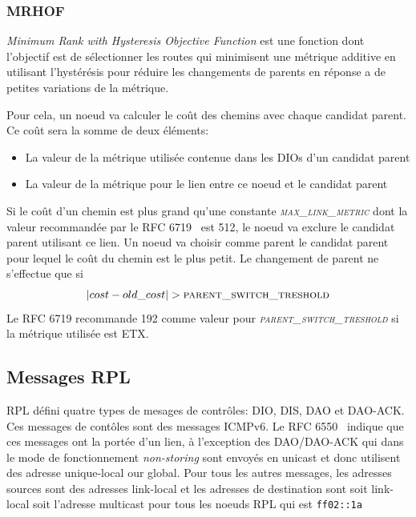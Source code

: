     \subsubsection*{MRHOF}%
            \textit{Minimum Rank with Hysteresis Objective Function} est une fonction dont l'objectif est de sélectionner les routes qui minimisent une métrique additive en utilisant l'hystérésis
            pour réduire les changements de parents en réponse a de petites variations de la métrique.
            
            Pour cela, un noeud va calculer le coût des chemins avec chaque candidat parent. Ce coût sera la somme de deux éléments:
            \begin{itemize}
                \item La valeur de la métrique utilisée contenue dans les DIOs d'un candidat parent
                \item La valeur de la métrique pour le lien entre ce noeud et le candidat parent
            \end{itemize}
            Si le coût d'un chemin est plus grand qu'une constante \textsl{\textsc{max\_link\_metric}} dont la valeur recommandée par le RFC 6719~\cite{rfc:mrhof} est 512,
            le noeud va exclure le candidat parent utilisant ce lien.
            Un noeud va choisir comme parent le candidat parent pour lequel le coût du chemin est le plus petit. Le changement de parent ne s'effectue que si 
            \[ |cost-old\_cost| > \textsc{parent\_switch\_treshold} \]
            Le RFC 6719 recommande 192 comme valeur pour \textsl{\textsc{parent\_switch\_treshold}} si la métrique utilisée est ETX.

\subsection*{Messages RPL}
    RPL défini quatre types de mesages de contrôles: DIO, DIS, DAO et DAO-ACK. Ces messages de contôles sont des messages ICMPv6. Le RFC 6550~\cite{rfc:rpl} indique que ces messages ont la portée d'un lien, à l'exception des DAO/DAO-ACK qui dans le mode de fonctionnement \textit{non-storing} sont envoyés en unicast et donc utilisent des adresse unique-local our global. Pour tous les autres messages, les adresses sources sont des adresses link-local et les adresses de destination sont soit link-local soit l'adresse multicast pour tous les noeuds RPL qui est \texttt{ff02::1a}

